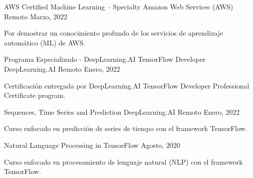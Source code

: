

\begin{cventries}
  \cventry
    {AWS Certified Machine Learning – Specialty} %
    {Amazon Web Services (AWS)} %
    {Remoto} %
    {Marzo, 2022} %
    {
      \begin{cvitems} %
        \item {Por demostrar un conocimiento profundo de los servicios de aprendizaje automático (ML) de AWS.}
      \end{cvitems}
    } %
  \cventry
    {Programa Especializado - DeepLearning.AI TensorFlow Developer} %
    {DeepLearning.AI} %
    {Remoto} %
    {Enero, 2022} %
    {
      \begin{cvitems} %
        \item {Certificación entregada por DeepLearning.AI TensorFlow Developer Professional Certificate program.}
      \end{cvitems}
    }
  \cventry
    {Sequences, Time Series and Prediction} %
    {DeepLearning.AI} %
    {Remoto} %
    {Enero, 2022} %
    {
      \begin{cvitems} %
        \item {Curso enfocado en predicción de series de tiempo con el framework TensorFlow.}
      \end{cvitems}
    }
  \cventry
    {Natural Language Processing in TensorFlow} %
    {} %
    {} %
    {Agosto, 2020} %
    {
      \begin{cvitems} %
        \item {Curso enfocado en procesamiento de lenguaje natural (NLP) con el framework TensorFlow.}
      \end{cvitems}
    }


\end{cventries}
